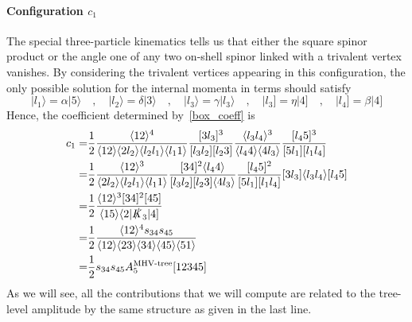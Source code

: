 \paragraph{Configuration $c_1$}
The special three-particle kinematics tells us that either the square spinor product or the angle one of any two on-shell spinor linked with a trivalent vertex vanishes.
By considering the trivalent vertices appearing in this configuration, the only possible solution for the internal momenta in terms should satisfy
\begin{equation*}
|l_1\rangle = \alpha |5\rangle \quad,\quad
|l_2\rangle = \delta |3\rangle \quad,\quad
|l_3\rangle = \gamma |l_3\rangle\quad,\quad
|l_3] = \eta|4]\quad,\quad
|l_4] = \beta |4]
\end{equation*}
Hence, the coefficient determined by~\cref{box_coeff} is
\begin{equation*}
\begin{split}
c_1 = &
\frac{1}{2}\frac{\langle 12 \rangle^4}{\langle 1 2 \rangle \langle 2 l_2\rangle \langle l_2 l_1 \rangle\langle l_1 1 \rangle}
\frac{[3l_3]^3}{[l_3 l_2][l_2 3]}
\frac{\langle l_3 l_4 \rangle^{3}}{\langle l_4 4 \rangle \langle 4 l_3\rangle}
\frac{[l_4 5 ]^3}{[5l_1][l_1 l_4]}
\\
= & 
\frac{1}{2}\frac{\langle 12 \rangle^3}{\langle 2 l_2 \rangle\langle l_2 l_1 \rangle\langle l_1 1\rangle}
\frac{[34]^2\langle l_4 4\rangle}{[l_3 l_2][l_2 3]\langle 4 l_3\rangle}
\frac{[l_4 5]^2}{[5l_1 ][l_1 l_4]}
[3 l_3]\langle l_3 l_4 \rangle [l_4 5]
\\
= &
\frac{1}{2}
\frac{\langle 12 \rangle^3[34]^2[45]}{\langle 15 \rangle\langle2|\slashed{K}_{3}|4]}
\\
= &
\frac{1}{2}\frac{\langle 12 \rangle^4 s_{34}s_{45}}{\langle 12 \rangle\langle 23 \rangle \langle 34\rangle \langle 45\rangle \langle 51\rangle}
\\
= &
\frac{1}{2}s_{34}s_{45}A_5^{\textrm{MHV-tree}}[12345]
\end{split}
\end{equation*}
As we will see, all the contributions that we will compute are related to the tree-level amplitude by the same structure as given in the last line.   
%
%
%
\iffalse
\begin{figure}
  \centering
    \texttt{[image: A5-8]}
    \caption{A5-8}
  \label{A5-8}
\end{figure}
\fi
